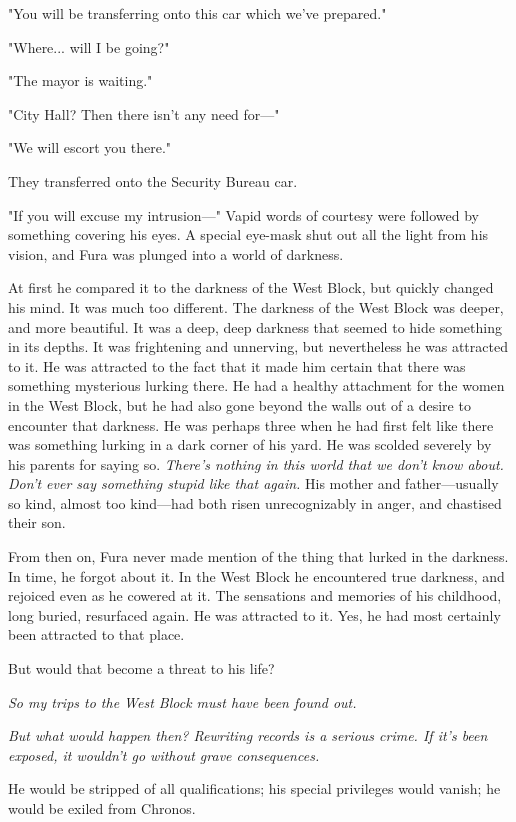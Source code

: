 "You will be transferring onto this car which we've prepared."

"Where... will I be going?"

"The mayor is waiting."

"City Hall? Then there isn't any need for---"

"We will escort you there."

They transferred onto the Security Bureau car.

"If you will excuse my intrusion---" Vapid words of courtesy were followed
by something covering his eyes. A special eye-mask shut out all the
light from his vision, and Fura was plunged into a world of darkness.

At first he compared it to the darkness of the West Block, but quickly
changed his mind. It was much too different. The darkness of the West
Block was deeper, and more beautiful. It was a deep, deep darkness that
seemed to hide something in its depths. It was frightening and
unnerving, but nevertheless he was attracted to it. He was attracted to
the fact that it made him certain that there was something mysterious
lurking there. He had a healthy attachment for the women in the West
Block, but he had also gone beyond the walls out of a desire to
encounter that darkness. He was perhaps three when he had first felt
like there was something lurking in a dark corner of his yard. He was
scolded severely by his parents for saying so. \emph{There's nothing in this
world that we don't know about. Don't ever say something stupid like
that again.} His mother and father---usually so kind, almost too kind---had
both risen unrecognizably in anger, and chastised their son.

From then on, Fura never made mention of the thing that lurked in the
darkness. In time, he forgot about it. In the West Block he encountered
true darkness, and rejoiced even as he cowered at it. The sensations and
memories of his childhood, long buried, resurfaced again. He was
attracted to it. Yes, he had most certainly been attracted to that
place.

But would that become a threat to his life?

\emph{So my trips to the West Block must have been found out.}

\emph{But what would happen then? Rewriting records is a serious crime. If
it's been exposed, it wouldn't go without grave consequences.}

He would be stripped of all qualifications; his special privileges would
vanish; he would be exiled from Chronos.

